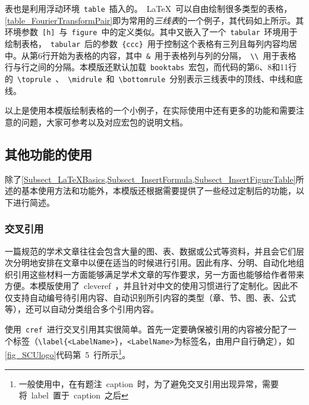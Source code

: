 表也是利用浮动环境~\verb|table|~插入的。~\LaTeX~可以自由绘制很多类型的表格，\cref{table_FourierTransformPair}即为常用的\emph{三线表}的一个例子，其代码如上所示。其环境参数~\verb|[h]|~与~\verb|figure|~中的定义类似。其中又嵌入了一个~\verb|tabular|~环境用于绘制表格，~\verb|tabular|~后的参数~\verb|{ccc}|~用于控制这个表格有三列且每列内容均居中。从第6行开始为表格的内容，其中~\verb|&|~用于表格列与列的分隔，~\verb|\\|~用于表格行与行之间的分隔。本模版还默认加载~\verb|booktabs|~宏包，而代码的第6、8和11行的~\verb|\toprule|~、~\verb|\midrule|~和~\verb|\bottomrule|~分别表示三线表中的顶线、中线和底线。


以上是使用本模版绘制表格的一个小例子，在实际使用中还有更多的功能和需要注意的问题，大家可参考以及对应宏包的说明文档。

\subsection{其他功能的使用}
\label{Subsect_OtherFunctions}
除了\cref{Subsect_LaTeXBasics,Subsect_InsertFormula,Subsect_InsertFigureTable}所述的基本使用方法和功能外，本模版还根据需要提供了一些经过定制后的功能，以下进行简述。
\subsubsection{交叉引用}
\label{Subsubsect_CrossRef}
一篇规范的学术文章往往会包含大量的图、表、数据或公式等资料，并且会它们层次分明地安排在文章中以便在适当的时候进行引用。因此有序、分明、自动化地组织引用这些材料一方面能够满足学术文章的写作要求，另一方面也能够给作者带来方便。本模版使用了~cleveref\cite{Packages_cleveref}~，并且针对中文的使用习惯进行了定制化。因此不仅支持自动编号待引用内容、自动识别所引内容的类型（章、节、图、表、公式等），还可以自动分类组合多个引用内容。


使用~\verb|cref|~进行交叉引用其实很简单\cite{Journal_Leo}。首先一定要确保被引用的内容被分配了一个标签（\verb|\label{<LabelName>}|，\verb|<LabelName>|为标签名，由用户自行确定），如\cref{fig_SCUlogo}代码第~5~行所示\footnote{一般使用中，在有题注~caption~时，为了避免交叉引用出现异常，需要将~label~置于~caption~之后}。

